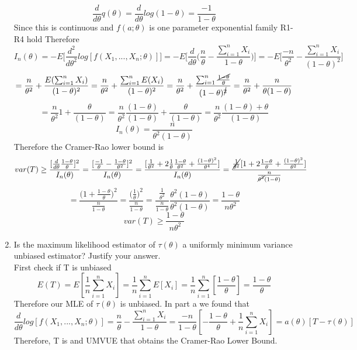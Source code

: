 \documentclass[a4paper]{article}
\begin{document}
\begin{enumerate}[label=(\alph*)]
		\[
		\frac{d}{d \theta}q(\theta)
		= \frac{d}{d \theta}log(1-\theta)
		= \frac{-1}{1-\theta}
		\]
		Since this is continuous and $f(a;\theta)$ is one parameter exponential family R1-R4 hold
		Therefore
		\[
		I_n(\theta) = -E\Big[\frac{d^2}{d \theta^2}log[f(X_1,...,X_n;\theta)]\Big]
		= -E\Big[\frac{d}{d \theta}\Big(\frac{n}{\theta}- \frac{\sum_{i=1}^{n}X_i}{1-\theta}\Big)\Big]
		= -E\Big[\frac{-n}{\theta^2}- \frac{\sum_{i=1}^{n}X_i}{(1-\theta)^2}\Big]
		 \]
		 \[
		 = \frac{n}{\theta^2}+ \frac{E(\sum_{i=1}^{n}X_i)}{(1-\theta)^2}
		 = \frac{n}{\theta^2}+ \frac{\sum_{i=1}^{n}E(X_i)}{(1-\theta)^2}
		 = \frac{n}{\theta^2}+ \frac{\sum_{i=1}^{n}\frac{\cancel{1-\theta}}{\theta}}{(1-\theta)^{\cancel{2}}}
		 = \frac{n}{\theta^2}+ \frac{n}{\theta(1-\theta)}
		 \]\[
		 =  \frac{n}{\theta^2}1+ \frac{\theta}{(1-\theta)}
		 = \frac{n}{\theta^2} \frac{(1-\theta)}{(1-\theta)}+ \frac{\theta}{(1-\theta)}
		 = \frac{n}{\theta^2}\frac{(1-\theta) + \theta}{(1-\theta)}
		 \]
		 \[ 
		 I_n(\theta) = \frac{n}{\theta^2(1-\theta)}
		 \]
		 Therefore the Cramer-Rao lower bound is
		 \[
		 var(T) \geq \frac{[\frac{d}{d\theta}\frac{1-\theta}{\theta}]^2}{I_n(\theta)}
		 =\frac{[\frac{-1}{\theta}-\frac{1-\theta}{\theta^2}]^2}{I_n(\theta)}
		 =\frac{[\frac{1}{\theta^2}+2\frac{1}{\theta}\frac{1-\theta}{\theta^2}+\frac{(1-\theta)^2}{\theta^4}]}{I_n(\theta)}
		 =\frac{\cancel{\frac{1}{\theta^2}}[1+2\frac{1-\theta}{\theta}+\frac{(1-\theta)^2}{\theta^2}]}{\frac{n}{\cancel{\theta^2}(1-\theta)}}
		 \]
		 \[		 
		 =\frac{\Big(1+\frac{1-\theta}{\theta}\Big)^2}{\frac{n}{1-\theta}}
		=\frac{\Big(\frac{1}{\theta}\Big)^2}{\frac{n}{1-\theta}} 
		=\frac{\frac{1}{\theta^2}}{\frac{n}{1-\theta}} \frac{\theta^2(1-\theta)}{\theta^2(1-\theta)}
		= \frac{1-\theta}{n\theta^2}
		 \]
		 \[
		 var(T) \geq \frac{1-\theta}{n\theta^2}
		 \]
		 \item Is the maximum likelihood estimator of $\tau(\theta)$ a uniformly minimum variance unbiased estimator? Justify your answer.
		 \\First check if T is unbiased
		 \[
		 E(T) = E[\frac{1}{n}\sum_{i=1}^{n}X_i] = \frac{1}{n}\sum_{i=1}^{n}E[X_i]
		 = \frac{1}{n}\sum_{i=1}^{n}[\frac{1-\theta}{\theta}]
		 = \frac{1-\theta}{\theta}
		 \]
		 Therefore our MLE of $\tau(\theta)$ is unbiased.
		 In part a we found that
		 \[
		 \frac{d}{d \theta} log[f(X_1,...,X_n;\theta)] = \frac{n}{\theta}- \frac{\sum_{i=1}^{n}X_i}{1-\theta} = \frac{-n}{1-\theta}[-\frac{1-\theta}{\theta} + \frac{1}{n}\sum_{i=1}^{n}X_i]
		 = a(\theta)[T-\tau(\theta)]
		 \]
Therefore, T is and UMVUE that obtains the Cramer-Rao Lower Bound.
	\end{enumerate}
	
\end{document}
